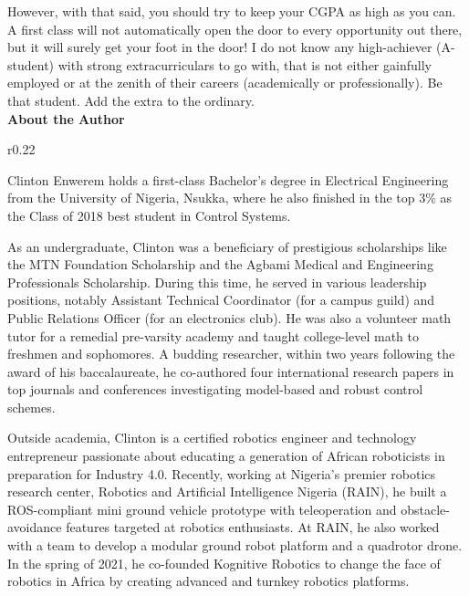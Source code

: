 \documentclass[letter]{article}
\begin{document}
However, with that said, you should try to keep your CGPA as high as you can. A first class will not automatically open the door to every opportunity out there, but it will surely get your foot in the door! I do not know any high-achiever (A-student) with strong extracurriculars to go with, that is not either gainfully employed or at the zenith of their careers (academically or professionally). Be that student. Add the extra to the ordinary.\\

\sffamily
\textbf{About the Author}\\
\vspace{-12px}
\normalfont
\begin{wrapfigure}{r}{0.22\textwidth}
	\begin{center}
		\setlength{\fboxrule}{1.2pt}
		\setlength{\fboxsep}{-1pt}
	\end{center}
\end{wrapfigure}
Clinton Enwerem holds a first-class Bachelor’s degree in Electrical Engineering from the University of Nigeria, Nsukka, where he also finished in the top 3\% as the Class of 2018 best student in Control Systems.

As an undergraduate, Clinton was a beneficiary of prestigious scholarships like the MTN Foundation Scholarship and the Agbami Medical and Engineering Professionals Scholarship. During this time, he served in various leadership positions, notably Assistant Technical Coordinator (for a campus guild) and Public Relations Officer (for an electronics club). He was also a volunteer math tutor for a remedial pre-varsity academy and taught college-level math to freshmen and sophomores. A budding researcher, within two years following the award of his baccalaureate, he co-authored four international research papers in top journals and conferences investigating model-based and robust control schemes.

Outside academia, Clinton is a certified robotics engineer and technology entrepreneur passionate about educating a generation of African roboticists in preparation for Industry 4.0. Recently, working at Nigeria’s premier robotics research center, Robotics and Artificial Intelligence Nigeria (RAIN), he built a ROS-compliant mini ground vehicle prototype with teleoperation and obstacle-avoidance features targeted at robotics enthusiasts. At RAIN, he also worked with a team to develop a modular ground robot platform and a quadrotor drone. In the spring of 2021, he co-founded Kognitive Robotics to change the face of robotics in Africa by creating advanced and turnkey robotics platforms.
\end{document}
